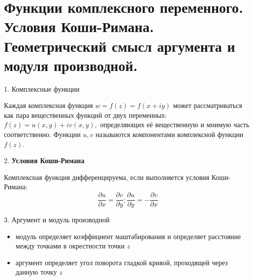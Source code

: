 \section{
    Функции комплексного переменного. Условия Коши-Римана. \\
    Геометрический смысл аргумента и модуля производной. 
}

1. Комплексные функции

Каждая комплексная функция ${\displaystyle w=f(z)=f(x+iy)}$
может рассматриваться как пара вещественных функций от двух переменных: 
${\displaystyle f(z)=u(x,y)+iv(x,y),}$ определяющих её вещественную и мнимую часть соответственно. 
Функции ${\displaystyle u,v}$ называются компонентами комплексной функции ${\displaystyle f(z)}$.

2. \textbf{Условия Коши-Римана}

Комплексная функция дифференцируема, если выполняется условия Коши-Римана:
$$
\frac{\partial u}{\partial x} = \frac{\partial v}{\partial y};
\frac{\partial u}{\partial y} = -\frac{\partial v}{\partial x}
$$

3. Аргумент и модуль производной
\begin{itemize}
    \item модуль определяет коэффициент маштабирования и определяет расстояние между точками в окрестности точки ${\displaystyle z}$
    \item аргумент определяет угол поворота гладкой кривой, проходящей через данную точку ${\displaystyle z}$
\end{itemize}

